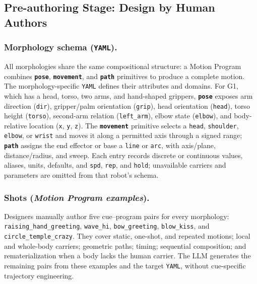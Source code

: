 \documentclass[letterpaper,10pt,conference]{ieeeconf}
\newcommand{\posecolor}[1]{\texttt{\textbf{\textcolor{PoseColor}{#1}}}}
\newcommand{\movecolor}[1]{\texttt{\textbf{\textcolor{MoveColor}{#1}}}}
\newcommand{\pathcolor}[1]{\texttt{\textbf{\textcolor{PathColor}{#1}}}}
\begin{document}
\subsection{Pre-authoring Stage: Design by Human Authors}
\setlength{\itemsep}{0.15em}
\subsubsection{Morphology schema (\texttt{YAML}).}
All morphologies share the same compositional structure: a Motion Program combines \posecolor{pose}, \movecolor{movement}, and \pathcolor{path} primitives to produce a complete motion.
The morphology-specific \texttt{YAML} defines their attributes and domains.
For G1, which has a head, torso, two arms, and hand-shaped grippers, \posecolor{pose} exposes arm direction (\texttt{dir}), gripper/palm orientation (\texttt{grip}), head orientation (\texttt{head}), torso height (\texttt{torso}), second-arm relation (\texttt{left\_arm}), elbow state (\texttt{elbow}), and body-relative location (\texttt{x}, \texttt{y}, \texttt{z}).
The \movecolor{movement} primitive selects a \texttt{head}, \texttt{shoulder}, \texttt{elbow}, or \texttt{wrist} and moves it along a permitted axis through a signed range; \pathcolor{path} assigns the end effector or base a \texttt{line} or \texttt{arc}, with axis/plane, distance/radius, and sweep.
Each entry records discrete or continuous values, aliases, units, defaults, and \texttt{spd}, \texttt{rep}, and \texttt{hold}; unavailable carriers and parameters are omitted from that robot's schema.

\subsubsection{Shots (\textit{Motion Program examples}).}
Designers manually author five cue--program pairs for every morphology: \texttt{raising\_hand\_greeting}, \texttt{wave\_hi}, \texttt{bow\_greeting}, \texttt{blow\_kiss}, and \texttt{circle\_temple\_crazy}.
They cover static, one-shot, and repeated motions; local and whole-body carriers; geometric paths; timing; sequential composition; and rematerialization when a body lacks the human carrier.
The LLM generates the remaining pairs from these examples and the target \texttt{YAML}, without cue-specific trajectory engineering.
\end{document}
